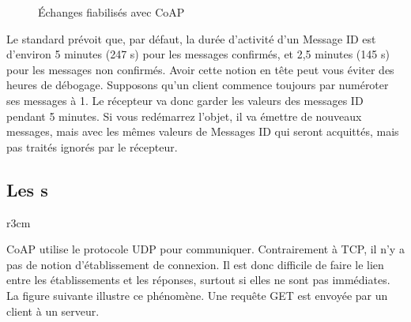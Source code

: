 \begin{figure}
\caption{Échanges fiabilisés avec CoAP} 
\label{fig-duree-max} 
\end{figure} 	

         \vspace{1em}

Le standard prévoit que, par défaut, la durée d’activité d’un Message ID est d’environ 5 minutes (247 s) pour les messages confirmés, et 2,5 minutes (145 s) pour les messages non confirmés.
Avoir cette notion en tête peut vous éviter des heures de débogage. Supposons qu'un client commence toujours par numéroter ses messages à 1. Le récepteur va donc garder les valeurs des messages ID pendant 5 minutes. Si vous redémarrez l'objet, il va émettre de nouveaux messages, mais avec les mêmes valeurs de Messages ID qui seront acquittés, mais pas traités ignorés par le récepteur.



\subsection{Les s}

\begin{wrapfigure}{r}{3cm}
\end{wrapfigure}

CoAP utilise le protocole UDP pour communiquer. Contrairement à TCP, il n’y a pas de notion d’établissement de connexion. Il est donc difficile de faire le lien entre les établissements et les réponses, surtout si elles ne sont pas immédiates. La figure suivante illustre ce phénomène. Une requête GET est envoyée par un client à un serveur.

